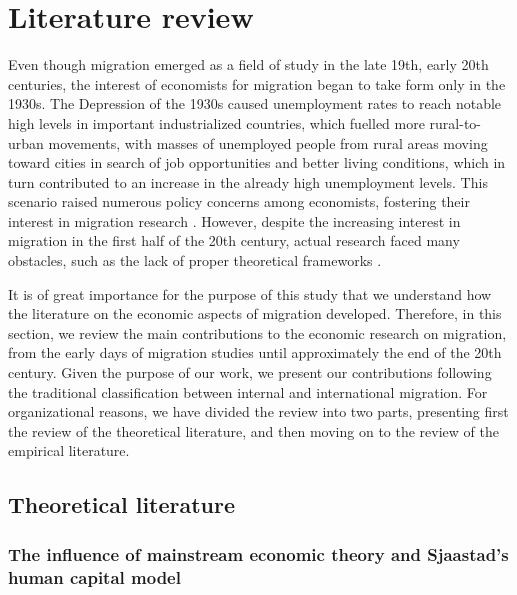 \section{Literature review} \label{lit_review}

Even though migration emerged as a field of study in the late 19th, early 20th centuries, the interest of economists for migration began to take form only in the 1930s. The Depression of the 1930s caused unemployment rates to reach notable high levels in important industrialized countries, which fuelled more rural-to-urban movements, with masses of unemployed people from rural areas moving toward cities in search of job opportunities and better living conditions, which in turn contributed to an increase in the already high unemployment levels. This scenario raised numerous policy concerns among economists, fostering their interest in migration research \citep{lucas_internal_1997, greenwood_internal_1997, greenwood_early_2003}. However, despite the increasing interest in migration in the first half of the 20th century, actual research faced many obstacles, such as the lack of proper theoretical frameworks \citep{greenwood_early_2003}.

It is of great importance for the purpose of this study that we understand how the literature on the economic aspects of migration developed. Therefore, in this section, we review the main contributions to the economic research on migration, from the early days of migration studies until approximately the end of the 20th century. Given the purpose of our work, we present our contributions following the traditional classification between internal and international migration. For organizational reasons, we have divided the review into two parts, presenting first the review of the theoretical literature, and then moving on to the review of the empirical literature.

\subsection{Theoretical literature} \label{lit_review_theories}

\subsubsection{The influence of mainstream economic theory and Sjaastad's human capital model}

